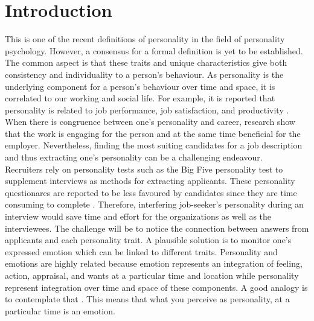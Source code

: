 \chapter{Introduction}
 \cite{personality-definition-BERGNER2020100759} This is one of the recent definitions of personality in the field of personality psychology. However, a consensus for a formal definition is yet to be established. The common aspect is that these traits and unique characteristics give both consistency and individuality to a person's behaviour. As personality is the underlying component for a person's behaviour over time and space, it is correlated to our working and social life. For example, it is reported that personality is related to job performance, job satisfaction, and productivity \cite{personality-prediction-questions-9121971}. When there is congruence between one’s personality and career, research show that the work is engaging for the person and at the same time beneficial for the employer. Nevertheless, finding the most suiting candidates for a job description and thus extracting one's personality can be a challenging endeavour. \\

Recruiters rely on personality tests such as the Big Five personality test to supplement interviews as methods for extracting applicants. These personality questionares are reported to be less favoured by candidates since they are time consuming to complete \cite{personality-prediction-questions-9121971}. Therefore, interfering job-seeker's personality during an interview would save time and effort for the organizations as well as the interviewees. The challenge will be to notice the connection between answers from applicants and each personality trait. A plausible solution is to monitor one's expressed emotion  which can be linked to different traits. Personality and emotions are highly related because emotion represents an integration of feeling, action, appraisal, and wants at a particular time and location while personality represent integration over time and space of these components. A good analogy is to contemplate that  \cite{personality-and-emotion-revelle2009personality}. This means that what you perceive as personality, at a particular time is an emotion.  \\ 

